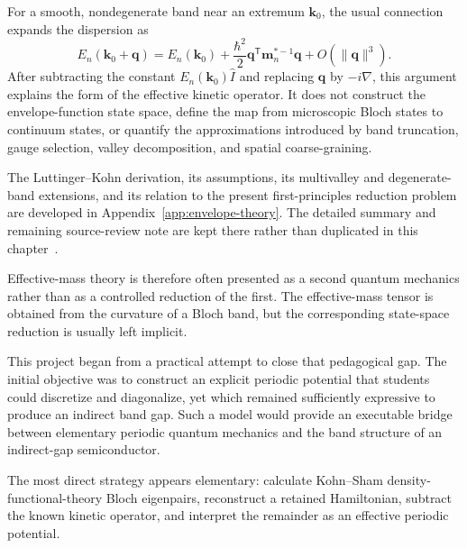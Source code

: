 For a smooth, nondegenerate band near an extremum $\mathbf k_0$, the usual
connection expands the dispersion as
\begin{equation}
    E_n(\mathbf k_0+\mathbf q)
    =
    E_n(\mathbf k_0)
    +
    \frac{\hbar^2}{2}
    \mathbf q^{\mathsf T}\mathbf m_n^{*-1}\mathbf q
    +
    O\!\left(\lVert\mathbf q\rVert^3\right).
\end{equation}
After subtracting the constant $E_n(\mathbf k_0)\hat I$ and replacing
$\mathbf q$ by $-i\nabla$, this argument explains the form of the effective
kinetic operator. It does not construct the envelope-function state space,
define the map from microscopic Bloch states to continuum states, or quantify
the approximations introduced by band truncation, gauge selection, valley
decomposition, and spatial coarse-graining.

The Luttinger--Kohn derivation, its assumptions, its multivalley and degenerate-
band extensions, and its relation to the present first-principles reduction
problem are developed in Appendix~\ref{app:envelope-theory}. The detailed
summary and remaining source-review note are kept there rather than duplicated
in this chapter~\cite{luttingerKohn1955}.

Effective-mass theory is therefore often presented as a second quantum
mechanics rather than as a controlled reduction of the first. The
effective-mass tensor is obtained from the curvature of a Bloch band, but the
corresponding state-space reduction is usually left implicit.

This project began from a practical attempt to close that pedagogical gap. The
initial objective was to construct an explicit periodic potential that students
could discretize and diagonalize, yet which remained sufficiently expressive
to produce an indirect band gap. Such a model would provide an executable
bridge between elementary periodic quantum mechanics and the band structure of
an indirect-gap semiconductor.

The most direct strategy appears elementary: calculate Kohn--Sham
density-functional-theory Bloch eigenpairs, reconstruct a retained Hamiltonian,
subtract the known kinetic operator, and interpret the remainder as an
effective periodic potential.

